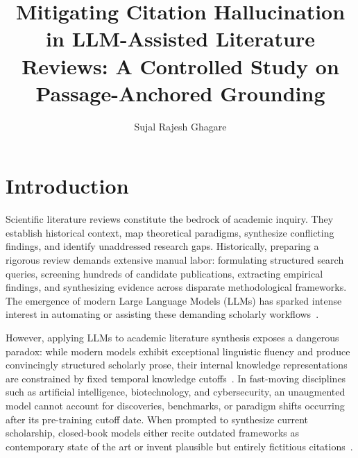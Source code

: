 \documentclass[acmsmall,screen]{acmart}
\title{Mitigating Citation Hallucination in LLM-Assisted Literature Reviews: A Controlled Study on Passage-Anchored Grounding}
\author{Sujal Rajesh Ghagare}
\affiliation{%
  \institution{Indian Institute of Information Technology Allahabad}
  \department{Department of Information Technology}
  \city{Prayagraj}
  \country{India}
}
\begin{document}
\maketitle

\section{Introduction}

Scientific literature reviews constitute the bedrock of academic inquiry. They establish historical context, map theoretical paradigms, synthesize conflicting findings, and identify unaddressed research gaps. Historically, preparing a rigorous review demands extensive manual labor: formulating structured search queries, screening hundreds of candidate publications, extracting empirical findings, and synthesizing evidence across disparate methodological frameworks. The emergence of modern Large Language Models (LLMs) has sparked intense interest in automating or assisting these demanding scholarly workflows~\cite{lewis2020rag,gao2023rag}.

However, applying LLMs to academic literature synthesis exposes a dangerous paradox: while modern models exhibit exceptional linguistic fluency and produce convincingly structured scholarly prose, their internal knowledge representations are constrained by fixed temporal knowledge cutoffs~\cite{touvron2023llama2,brown2020gpt3}. In fast-moving disciplines such as artificial intelligence, biotechnology, and cybersecurity, an unaugmented model cannot account for discoveries, benchmarks, or paradigm shifts occurring after its pre-training cutoff date. When prompted to synthesize current scholarship, closed-book models either recite outdated frameworks as contemporary state of the art or invent plausible but entirely fictitious citations~\cite{walters2023,chelli2024}.
\end{document}
